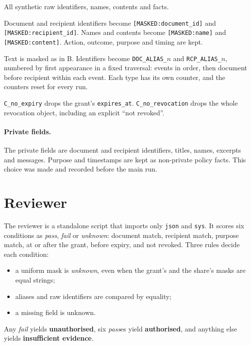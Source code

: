 \documentclass[11pt]{article}
\newcommand{\code}[1]{\texttt{#1}}
\begin{document}
\begin{description}[leftmargin=1.2em]
  \item[A. Full evidence.] All synthetic raw identifiers, names, contents and facts.
  \item[B. Uniform masking.] Document and recipient identifiers become \code{[MASKED:document\_id]} and \code{[MASKED:recipient\_id]}. Names and contents become \code{[MASKED:name]} and \code{[MASKED:content]}. Action, outcome, purpose and timing are kept.
  \item[C. Consistent aliases.] Text is masked as in B. Identifiers become \code{DOC\_ALIAS\_$n$} and \code{RCP\_ALIAS\_$n$}, numbered by first appearance in a fixed traversal: events in order, then document before recipient within each event. Each type has its own counter, and the counters reset for every run.
  \item[C ablations.] \code{C\_no\_expiry} drops the grant's \code{expires\_at}. \code{C\_no\_revocation} drops the whole revocation object, including an explicit ``not revoked''.
\end{description}

\paragraph{Private fields.} The private fields are document and recipient identifiers, titles, names, excerpts and messages. Purpose and timestamps are kept as non-private policy facts. This choice was made and recorded before the main run.

\section{Reviewer}

The reviewer is a standalone script that imports only \code{json} and \code{sys}. It scores six conditions as \emph{pass}, \emph{fail} or \emph{unknown}: document match, recipient match, purpose match, at or after the grant, before expiry, and not revoked. Three rules decide each condition:
\begin{itemize}
  \item a uniform mask is \emph{unknown}, even when the grant's and the share's masks are equal strings;
  \item aliases and raw identifiers are compared by equality;
  \item a missing field is unknown.
\end{itemize}
Any \emph{fail} yields \textbf{unauthorised}, six \emph{pass}es yield \textbf{authorised}, and anything else yields \textbf{insufficient evidence}.
\end{document}
